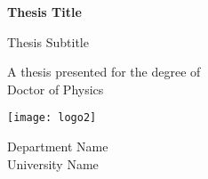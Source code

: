 \begin{titlepage}
	\begin{center}
		\vspace*{1cm}

		\Huge
		\textbf{Thesis Title}
		
		\vspace{0.5cm}
		\LARGE
		Thesis Subtitle

		\vspace{1.5cm}

		\vfill

		A thesis presented for the degree of\\
		Doctor of Physics

		\vspace{0.8cm}

		\texttt{[image: logo2]}

		\Large
		Department Name\\
		University Name\\
	\end{center}
\end{titlepage}

